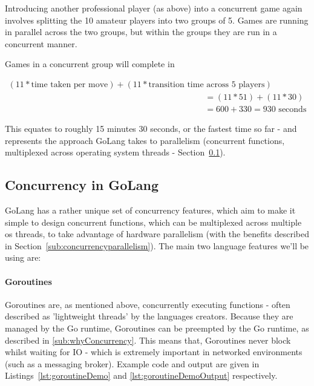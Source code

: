 Introducing another professional player (as above) into a concurrent game again
involves splitting the 10 amateur players into two groups of 5. Games are
running in parallel across the two groups, but within the groups they are run in
a concurrent manner.

Games in a concurrent group will complete in

\begin{equation}
  \begin{split}
    (11 * \text{time taken per move}) + (11 * \text{transition time across 5 players}) \\
    &= (11 * 51) + (11 * 30) \\
    &= 600 + 330 = 930 \text{ seconds}
  \end{split}
\end{equation}

This equates to roughly 15 minutes 30 seconds, or the fastest time so far - and
represents the approach GoLang takes to parallelism (concurrent functions,
multiplexed across operating system threads -
Section~\ref{sub:golangConcurrency}).

\subsection{Concurrency in GoLang}
\label{sub:golangConcurrency}

GoLang has a rather unique set of concurrency features, which aim to make it
simple to design concurrent functions, which can be multiplexed across multiple
\gls{os} threads, to take advantage of hardware parallelism (with the benefits
described in Section~\ref{sub:concurrencyparallelism}). The main two language features we'll be using are:

\paragraph{Goroutines}

Goroutines are, as mentioned above, concurrently executing functions - often
described as 'lightweight threads' by the languages creators.
Because they are managed by the Go runtime, Goroutines can be \gls{preempted} by
the Go runtime, as described in \ref{sub:whyConcurrency}. This means that,
Goroutines never block whilst waiting for IO - which is extremely important in
networked environments (such as a messaging broker). Example code and output are
given in Listings~\ref{lst:goroutineDemo} and \ref{lst:goroutineDemoOutput}
respectively.

